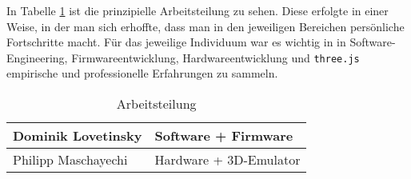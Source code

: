 In Tabelle \ref{tab:teilung} ist die prinzipielle Arbeitsteilung zu sehen. Diese erfolgte in einer Weise, in der man sich erhoffte, dass man in den jeweiligen Bereichen persönliche Fortschritte macht. Für das jeweilige Individuum war es wichtig in in Software-Engineering, Firmwareentwicklung, Hardwareentwicklung und \texttt{three.js} empirische und professionelle Erfahrungen zu sammeln.\newline

\begin{table}[H]
    \centering
    \begin{tabular}{|l|l|}
        \hline
        Dominik Lovetinsky&Software + Firmware\\
        \hline
        Philipp Maschayechi&Hardware + 3D-Emulator\\
        \hline
    \end{tabular}
    \caption{Arbeitsteilung}
    \label{tab:teilung}
\end{table}

